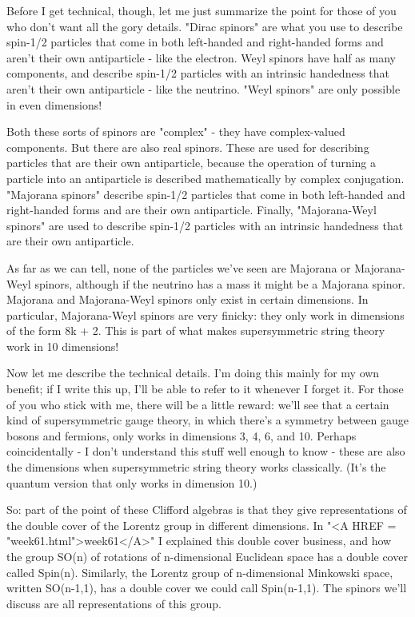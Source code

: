 Before I get technical, though, let me just summarize the point for 
those of you who don't want all the gory details.   "Dirac spinors"
are what you use to describe spin-1/2 particles that come in both
left-handed and right-handed forms and aren't their own antiparticle 
- like the electron.  Weyl spinors have half as many components,
and describe spin-1/2 particles with an intrinsic handedness that 
aren't their own antiparticle - like the neutrino.   "Weyl spinors"
are only possible in even dimensions!

Both these sorts of spinors are "complex" - they have complex-valued 
components.  But there are also real spinors.  These are used for describing 
particles that are their own antiparticle, because the operation of 
turning a particle into an antiparticle is described mathematically
by complex conjugation.  "Majorana spinors" describe spin-1/2 particles 
that come in both left-handed and right-handed forms and are their 
own antiparticle.  Finally, "Majorana-Weyl spinors" are used to describe 
spin-1/2 particles with an intrinsic handedness that are their own
antiparticle.  

As far as we can tell, none of the particles we've seen are Majorana
or Majorana-Weyl spinors, although if the neutrino has a mass it
might be a Majorana spinor.  Majorana and Majorana-Weyl spinors
only exist in certain dimensions.  In particular, Majorana-Weyl spinors
are very finicky: they only work in dimensions of the form 8k + 2.  
This is part of what makes supersymmetric string theory work in 10 
dimensions!

Now let me describe the technical details.  I'm doing this mainly
for my own benefit; if I write this up, I'll be able to refer to
it whenever I forget it.  For those of you who stick with me, there
will be a little reward: we'll see that a certain kind of supersymmetric 
gauge theory, in which there's a symmetry between gauge bosons and 
fermions, only works in dimensions 3, 4, 6, and 10.  Perhaps 
coincidentally - I don't understand this stuff well enough to know -
these are also the dimensions when supersymmetric string theory works
classically.  (It's the quantum version that only works in dimension 10.)

So: part of the point of these Clifford algebras is that they give 
representations of the double cover of the Lorentz group in different
dimensions.  In "<A HREF = "week61.html">week61</A>" I explained this double cover business,
and how the group SO(n) of rotations of n-dimensional Euclidean space 
has a double cover called Spin(n).  Similarly, the Lorentz group
of n-dimensional Minkowski space, written SO(n-1,1), has a double cover 
we could call Spin(n-1,1).  The spinors we'll discuss are all 
representations of this group.  

